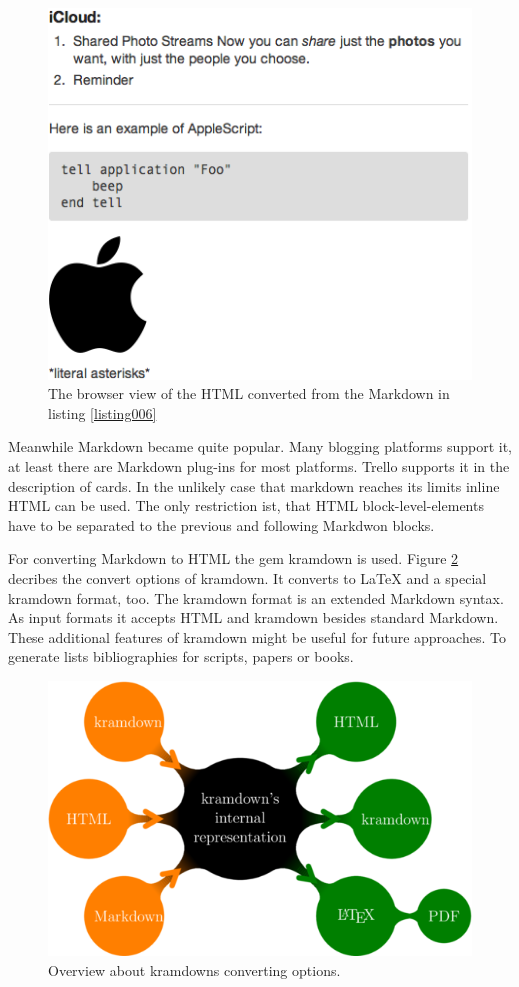 \begin{figure}[htb]
\centering
\includegraphics[scale=0.6]{figures/markdown-result}
\caption{The browser view of the HTML converted from the Markdown in listing \ref{listing006}}
\label{fig:markdown-result}
\end{figure}

Meanwhile Markdown became quite popular. Many blogging platforms support it, at least there are Markdown plug-ins for most platforms. Trello supports it in the description of cards. In the unlikely case that markdown reaches its limits inline HTML can be used. The only restriction ist, that HTML block-level-elements have to be separated to the previous and following Markdwon blocks.

For converting Markdown to HTML the gem kramdown is used. Figure \ref{fig:kramdown} decribes the convert options of kramdown. It converts to LaTeX and a special kramdown format, too. The kramdown format is an extended Markdown syntax. As input formats it accepts HTML and kramdown besides standard Markdown. \cite{kramdown} These additional features of kramdown might be useful for future approaches. To generate lists bibliographies for scripts, papers or books.

\begin{figure}[htb]
\centering
\includegraphics[width=\textwidth]{figures/kramdown}
\caption{Overview about kramdowns converting options. \cite{kramdown}}
\label{fig:kramdown}
\end{figure}

